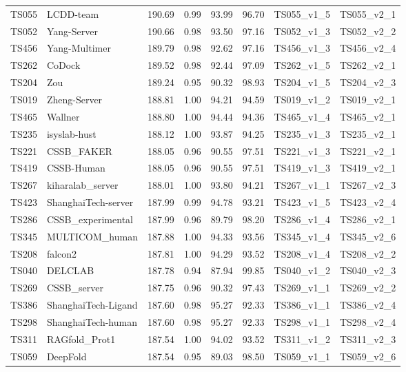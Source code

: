 \begin{longtable}{llllllll}
TS055 & LCDD-team & 190.69 & 0.99 & 93.99 & 96.70 & TS055\_v1\_5 & TS055\_v2\_1 \\ 
TS052 & Yang-Server & 190.66 & 0.98 & 93.50 & 97.16 & TS052\_v1\_3 & TS052\_v2\_2 \\ 
TS456 & Yang-Multimer & 189.79 & 0.98 & 92.62 & 97.16 & TS456\_v1\_3 & TS456\_v2\_4 \\ 
TS262 & CoDock & 189.52 & 0.98 & 92.44 & 97.09 & TS262\_v1\_5 & TS262\_v2\_1 \\ 
TS204 & Zou & 189.24 & 0.95 & 90.32 & 98.93 & TS204\_v1\_5 & TS204\_v2\_3 \\ 
TS019 & Zheng-Server & 188.81 & 1.00 & 94.21 & 94.59 & TS019\_v1\_2 & TS019\_v2\_1 \\ 
TS465 & Wallner & 188.80 & 1.00 & 94.44 & 94.36 & TS465\_v1\_4 & TS465\_v2\_1 \\ 
TS235 & isyslab-hust & 188.12 & 1.00 & 93.87 & 94.25 & TS235\_v1\_3 & TS235\_v2\_1 \\ 
TS221 & CSSB\_FAKER & 188.05 & 0.96 & 90.55 & 97.51 & TS221\_v1\_3 & TS221\_v2\_1 \\ 
TS419 & CSSB-Human & 188.05 & 0.96 & 90.55 & 97.51 & TS419\_v1\_3 & TS419\_v2\_1 \\ 
TS267 & kiharalab\_server & 188.01 & 1.00 & 93.80 & 94.21 & TS267\_v1\_1 & TS267\_v2\_3 \\ 
TS423 & ShanghaiTech-server & 187.99 & 0.99 & 94.78 & 93.21 & TS423\_v1\_5 & TS423\_v2\_4 \\ 
TS286 & CSSB\_experimental & 187.99 & 0.96 & 89.79 & 98.20 & TS286\_v1\_4 & TS286\_v2\_1 \\ 
TS345 & MULTICOM\_human & 187.88 & 1.00 & 94.33 & 93.56 & TS345\_v1\_4 & TS345\_v2\_6 \\ 
TS208 & falcon2 & 187.81 & 1.00 & 94.29 & 93.52 & TS208\_v1\_4 & TS208\_v2\_2 \\ 
TS040 & DELCLAB & 187.78 & 0.94 & 87.94 & 99.85 & TS040\_v1\_2 & TS040\_v2\_3 \\ 
TS269 & CSSB\_server & 187.75 & 0.96 & 90.32 & 97.43 & TS269\_v1\_1 & TS269\_v2\_2 \\ 
TS386 & ShanghaiTech-Ligand & 187.60 & 0.98 & 95.27 & 92.33 & TS386\_v1\_1 & TS386\_v2\_4 \\ 
TS298 & ShanghaiTech-human & 187.60 & 0.98 & 95.27 & 92.33 & TS298\_v1\_1 & TS298\_v2\_4 \\ 
TS311 & RAGfold\_Prot1 & 187.54 & 1.00 & 94.02 & 93.52 & TS311\_v1\_2 & TS311\_v2\_3 \\ 
TS059 & DeepFold & 187.54 & 0.95 & 89.03 & 98.50 & TS059\_v1\_1 & TS059\_v2\_6 \\ 

\end{longtable}
